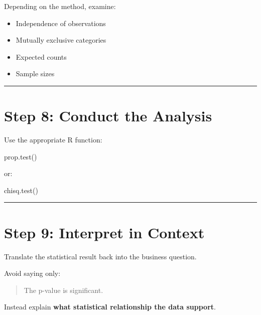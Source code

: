 \documentclass[
  letterpaper,
  DIV=11,
  numbers=noendperiod]{scrreprt}
\newenvironment{Shaded}{\begin{snugshade}}{\end{snugshade}}
\newcommand{\FunctionTok}[1]{\textcolor[rgb]{0.28,0.35,0.67}{#1}}
\newcommand{\NormalTok}[1]{\textcolor[rgb]{0.00,0.23,0.31}{#1}}
\providecommand{\tightlist}{%
  \setlength{\itemsep}{0pt}\setlength{\parskip}{0pt}}
\begin{document}
Depending on the method, examine:

\begin{itemize}
\tightlist
\item
  Independence of observations
\item
  Mutually exclusive categories
\item
  Expected counts
\item
  Sample sizes
\end{itemize}

\begin{center}\rule{0.5\linewidth}{0.5pt}\end{center}

\section{Step 8: Conduct the
Analysis}\label{step-8-conduct-the-analysis}

Use the appropriate R function:

\begin{Shaded}
\begin{Highlighting}[]
\FunctionTok{prop.test}\NormalTok{()}
\end{Highlighting}
\end{Shaded}

or:

\begin{Shaded}
\begin{Highlighting}[]
\FunctionTok{chisq.test}\NormalTok{()}
\end{Highlighting}
\end{Shaded}

\begin{center}\rule{0.5\linewidth}{0.5pt}\end{center}

\section{Step 9: Interpret in
Context}\label{step-9-interpret-in-context}

Translate the statistical result back into the business question.

Avoid saying only:

\begin{quote}
The p-value is significant.
\end{quote}

Instead explain \textbf{what statistical relationship the data support}.
\end{document}
